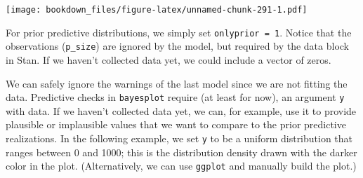 \documentclass[12pt,]{krantz}
\newenvironment{Shaded}{\begin{snugshade}}{\end{snugshade}}
\newcommand{\KeywordTok}[1]{\textcolor[rgb]{0.13,0.29,0.53}{\textbf{#1}}}
\newcommand{\DataTypeTok}[1]{\textcolor[rgb]{0.13,0.29,0.53}{#1}}
\newcommand{\DecValTok}[1]{\textcolor[rgb]{0.00,0.00,0.81}{#1}}
\newcommand{\StringTok}[1]{\textcolor[rgb]{0.31,0.60,0.02}{#1}}
\newcommand{\CommentTok}[1]{\textcolor[rgb]{0.56,0.35,0.01}{\textit{#1}}}
\newcommand{\OtherTok}[1]{\textcolor[rgb]{0.56,0.35,0.01}{#1}}
\newcommand{\OperatorTok}[1]{\textcolor[rgb]{0.81,0.36,0.00}{\textbf{#1}}}
\newcommand{\NormalTok}[1]{#1}
\theoremstyle{definition}
\theoremstyle{definition}
\theoremstyle{definition}
\theoremstyle{remark}
\begin{document}
\texttt{[image: bookdown\_files/figure-latex/unnamed-chunk-291-1.pdf]}

For prior predictive distributions, we simply set
\texttt{onlyprior\ =\ 1}. Notice that the observations
(\texttt{p\_size}) are ignored by the model, but required by the data
block in Stan. If we haven't collected data yet, we could include a
vector of zeros.

\begin{Shaded}
\end{Shaded}

We can safely ignore the warnings of the last model since we are not
fitting the data. Predictive checks in \texttt{bayesplot} require (at
least for now), an argument \texttt{y} with data. If we haven't
collected data yet, we can, for example, use it to provide plausible or
implausible values that we want to compare to the prior predictive
realizations. In the following example, we set \texttt{y} to be a
uniform distribution that ranges between 0 and 1000; this is the
distribution density drawn with the darker color in the plot.
(Alternatively, we can use \texttt{ggplot} and manually build the plot.)

\begin{Shaded}
\end{Shaded}
\end{document}
